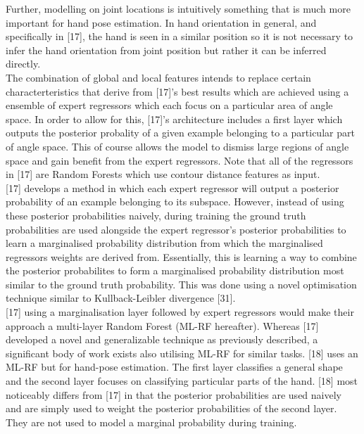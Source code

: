 \documentclass{article}
\begin{document}
Further, modelling on joint locations is intuitively something that is much more important for hand pose estimation. In hand orientation in general, and specifically in [17], the hand is seen in a similar position so it is not necessary to infer the hand orientation from joint position but rather it can be inferred directly.\\

The combination of global and local features intends to replace certain characterteristics that derive from [17]'s best results which are achieved using a ensemble of expert regressors which each focus on a particular area of angle space.  In order to allow for this, [17]'s architecture includes a first layer which outputs the posterior probality of a given example belonging to a particular part of angle space. This of course allows the model to dismiss large regions of angle space and gain benefit from the expert regressors. Note that all of the regressors in [17] are Random Forests which use contour distance features as input. \\

[17] develops a method in which each expert regressor will output a posterior probability of an example belonging to its subspace. However, instead of using these posterior probabilities naively, during training the ground truth probabilities are used alongside the expert regressor's posterior probabilities to learn a marginalised probability distribution from which the marginalised regressors weights are derived from. Essentially, this is learning a way to combine the  posterior probabilites to form a marginalised probability distribution most similar to the ground truth probability. This was done using a novel optimisation technique similar to  Kullback-Leibler divergence [31]. \\

[17] using a marginalisation layer followed by expert regressors would make their approach a multi-layer Random Forest (ML-RF hereafter). Whereas [17] developed a novel and generalizable technique as previously described, a significant body of work exists also utilising ML-RF for similar tasks. [18] uses an ML-RF but for hand-pose estimation. The first layer classifies a general shape and the second layer focuses on classifying particular parts of the hand. [18] most noticeably differs from [17] in that the posterior probabilities are used naively and are simply used to weight the posterior probabilities of the second layer. They are not used to model a marginal probability during training. \\
\end{document}
